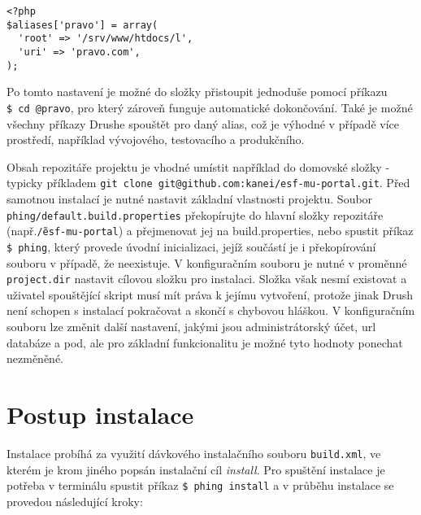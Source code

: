 \begin{lstlisting}
<?php
$aliases['pravo'] = array(
  'root' => '/srv/www/htdocs/l',
  'uri' => 'pravo.com',
);
\end{lstlisting}

Po tomto nastavení je možné do složky přistoupit jednoduše pomocí příkazu \texttt{\$~cd~@pravo}, pro který zároveň funguje automatické dokončování. Také je možné všechny příkazy Drushe spouštět pro daný alias, což je výhodné v případě více prostředí, například vývojového, testovacího a produkčního.

Obsah repozitáře projektu je vhodné umístit například do domovské složky - typicky příkladem \texttt{git clone git@github.com:kanei/esf-mu-portal.git}. Před samotnou instalací je nutné nastavit základní vlastnosti projektu. Soubor \texttt{phing/default.build.properties} překopírujte do hlavní složky repozitáře (např.\texttt{\~/esf-mu-portal}) a přejmenovat jej na build.properties, nebo spustit příkaz \texttt{\$~phing}, který provede úvodní inicializaci, jejíž součástí je i překopírování souboru v případě, že neexistuje. V konfiguračním souboru je nutné v proměnné \texttt{project.dir} nastavit cílovou složku pro instalaci. Složka však nesmí existovat a uživatel spouštějící skript musí mít práva k jejímu vytvoření, protože jinak Drush není schopen s instalací pokračovat a skončí s chybovou hláškou. V konfiguračním souboru lze změnit další nastavení, jakými jsou administrátorský účet, url databáze a pod, ale pro základní funkcionalitu je možné tyto hodnoty ponechat nezměněné.

\section{Postup instalace}
Instalace probíhá za využití dávkového instalačního souboru \texttt{build.xml}, ve kterém je krom jiného popsán instalační cíl \emph{install}. Pro spuštění instalace je potřeba v terminálu spustit příkaz \texttt{\$~phing install} a v  průběhu instalace se provedou následující kroky:

